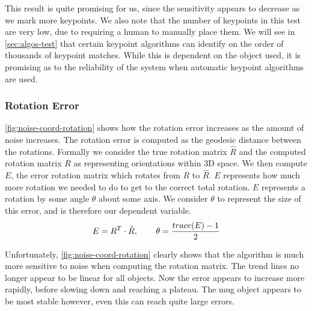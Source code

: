 This result is quite promising for us, since the sensitivity appears to decrease as we mark more keypoints. We also note that the number of keypoints in this test are very low, due to requiring a human to manually place them. We will see in \ref{sec:algos-test} that certain keypoint algorithms can identify on the order of thousands of keypoint matches. While this is dependent on the object used, it is promising as to the reliability of the system when automatic keypoint algorithms are used.

\subsubsection{Rotation Error}
\ref{fig:noise-coord-rotation} shows how the rotation error increases as the amount of noise increases. The rotation error is computed as the geodesic distance between the rotations. Formally we consider the true rotation matrix $\hat{R}$ and the computed rotation matrix $R$ as representing orientations within 3D space. We then compute $E$, the error rotation matrix which rotates from $R$ to $\hat{R}$. $E$ represents how much more rotation we needed to do to get to the correct total rotation. $E$ represents a rotation by some angle $\theta$ about some axis. We consider $\theta$ to represent the size of this error, and is therefore our dependent variable. 
$$E = R^T \cdot \hat{R}, \operatorname{\operatorname{\: \: \: \:} \operatorname{\: \: \: \:}} \theta = \frac{trace(E) - 1}{2}$$

Unfortunately, \ref{fig:noise-coord-rotation} clearly shows that the algorithm is much more sensitive to noise when computing the rotation matrix. The trend lines no longer appear to be linear for all objects. Now the error appears to increase more rapidly, before slowing down and reaching a plateau. The mug object appears to be most stable however, even this can reach quite large errors.\\


